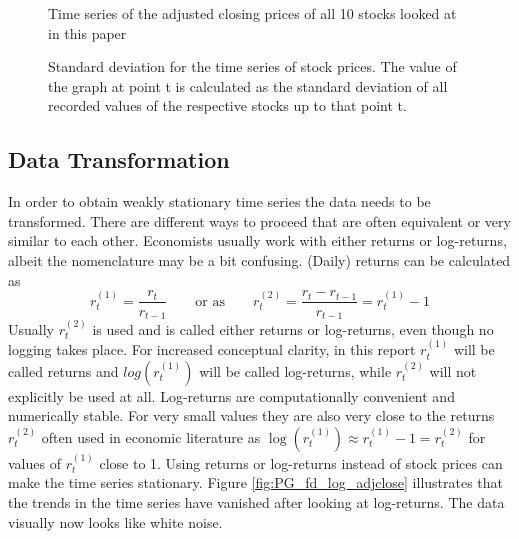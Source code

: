 \begin{figure}[h!]
    \centering
    \begin{adjustbox}{width=.9\textwidth,center}
    
    \end{adjustbox}  
    \caption{Time series of the adjusted closing prices of all 10 stocks looked at in this paper}
    \label{fig:Daily Stock Prices for all Stocks in the Data Set}
\end{figure}{}

\begin{figure}[h!]
    \centering
    \begin{adjustbox}{width=.9\textwidth,center}
    
    \end{adjustbox}  
    \caption{Standard deviation for the time series of stock prices. The value of the graph at point t is calculated as the standard deviation of all recorded values of the respective stocks up to that point t.}
    \label{fig:cum_sd_all}
\end{figure}{}

\subsection{Data Transformation}

In order to obtain weakly stationary time series the data needs to be transformed. There are different ways to proceed that are often equivalent or very similar to each other. Economists usually work with either returns or log-returns, albeit the nomenclature may be a bit confusing. (Daily) returns can be calculated as
\begin{equation*}
    r^{\scriptscriptstyle{(1)} }_t = \frac{r_t}{r_{t-1}} \qquad \text{or as} \qquad r^{\scriptscriptstyle{(2)}}_t = \frac{r_t - r_{t-1}}{r_{t-1}} = r^{\scriptscriptstyle{(1)}}_t - 1
\end{equation*}{}
Usually $r^{\scriptscriptstyle{(2)}}_t$ is used and is called either returns or log-returns, even though no logging takes place. For increased conceptual clarity, in this report $r^{\scriptscriptstyle{(1)}}_t$ will be called returns and $log(r^{\scriptscriptstyle{(1)}}_t)$ will be called log-returns, while $r^{\scriptscriptstyle{(2)}}_t$ will not explicitly be used at all. Log-returns are computationally convenient and numerically stable. For very small values they are also very close to the returns $r^{\scriptscriptstyle{(2)}}_t$ often used in economic literature as $ \log(r^{\scriptscriptstyle{(1)}}_t) \approx r^{\scriptscriptstyle{(1)}}_t - 1 = r^{\scriptscriptstyle{(2)}}_t$ for values of $r^{\scriptscriptstyle{(1)}}_t$ close to 1. Using returns or log-returns instead of stock prices can make the time series stationary. Figure \ref{fig:PG_fd_log_adjclose} illustrates that the trends in the time series have vanished after looking at log-returns. The data visually now looks like white noise. 

